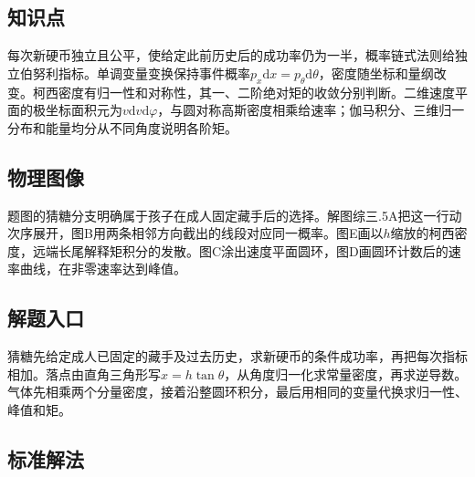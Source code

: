\documentclass[UTF8,fontset=fandol,a4paper,11pt]{ctexart}
\begin{document}

\subsection*{知识点}

每次新硬币独立且公平，使给定此前历史后的成功率仍为一半，概率链式法则给独立伯努利指标。单调变量变换保持事件概率$p_x\mathrm dx=p_\theta\mathrm d\theta$，密度随坐标和量纲改变。柯西密度有归一性和对称性，其一、二阶绝对矩的收敛分别判断。二维速度平面的极坐标面积元为$v\mathrm dv\mathrm d\varphi$，与圆对称高斯密度相乘给速率；伽马积分、三维归一分布和能量均分从不同角度说明各阶矩。



\subsection*{物理图像}

题图的猜糖分支明确属于孩子在成人固定藏手后的选择。解图综三.5A把这一行动次序展开，图B用两条相邻方向截出的线段对应同一概率。图E画以$h$缩放的柯西密度，远端长尾解释矩积分的发散。图C涂出速度平面圆环，图D画圆环计数后的速率曲线，在非零速率达到峰值。



\subsection*{解题入口}

猜糖先给定成人已固定的藏手及过去历史，求新硬币的条件成功率，再把每次指标相加。落点由直角三角形写$x=h\tan\theta$，从角度归一化求常量密度，再求逆导数。气体先相乘两个分量密度，接着沿整圆环积分，最后用相同的变量代换求归一性、峰值和矩。



\subsection*{标准解法}
\end{document}

